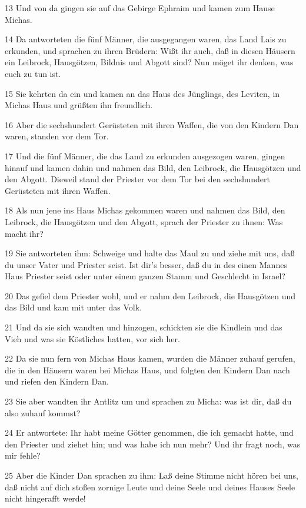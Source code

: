 \par 13 Und von da gingen sie auf das Gebirge Ephraim und kamen zum Hause Michas.
\par 14 Da antworteten die fünf Männer, die ausgegangen waren, das Land Lais zu erkunden, und sprachen zu ihren Brüdern: Wißt ihr auch, daß in diesen Häusern ein Leibrock, Hausgötzen, Bildnis und Abgott sind? Nun möget ihr denken, was euch zu tun ist.
\par 15 Sie kehrten da ein und kamen an das Haus des Jünglings, des Leviten, in Michas Haus und grüßten ihn freundlich.
\par 16 Aber die sechshundert Gerüsteten mit ihren Waffen, die von den Kindern Dan waren, standen vor dem Tor.
\par 17 Und die fünf Männer, die das Land zu erkunden ausgezogen waren, gingen hinauf und kamen dahin und nahmen das Bild, den Leibrock, die Hausgötzen und den Abgott. Dieweil stand der Priester vor dem Tor bei den sechshundert Gerüsteten mit ihren Waffen.
\par 18 Als nun jene ins Haus Michas gekommen waren und nahmen das Bild, den Leibrock, die Hausgötzen und den Abgott, sprach der Priester zu ihnen: Was macht ihr?
\par 19 Sie antworteten ihm: Schweige und halte das Maul zu und ziehe mit uns, daß du unser Vater und Priester seist. Ist dir's besser, daß du in des einen Mannes Haus Priester seist oder unter einem ganzen Stamm und Geschlecht in Israel?
\par 20 Das gefiel dem Priester wohl, und er nahm den Leibrock, die Hausgötzen und das Bild und kam mit unter das Volk.
\par 21 Und da sie sich wandten und hinzogen, schickten sie die Kindlein und das Vieh und was sie Köstliches hatten, vor sich her.
\par 22 Da sie nun fern von Michas Haus kamen, wurden die Männer zuhauf gerufen, die in den Häusern waren bei Michas Haus, und folgten den Kindern Dan nach und riefen den Kindern Dan.
\par 23 Sie aber wandten ihr Antlitz um und sprachen zu Micha: was ist dir, daß du also zuhauf kommst?
\par 24 Er antwortete: Ihr habt meine Götter genommen, die ich gemacht hatte, und den Priester und ziehet hin; und was habe ich nun mehr? Und ihr fragt noch, was mir fehle?
\par 25 Aber die Kinder Dan sprachen zu ihm: Laß deine Stimme nicht hören bei uns, daß nicht auf dich stoßen zornige Leute und deine Seele und deines Hauses Seele nicht hingerafft werde!
